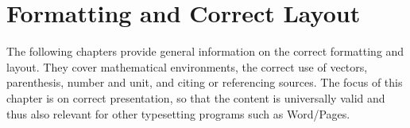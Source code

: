 
\chapter{Formatting and Correct Layout}
\label{cha:formatting}
The following chapters provide general information on the correct formatting and layout. They cover mathematical environments, the correct use of vectors, parenthesis, number and unit, and citing or referencing sources. The focus of this chapter is on correct presentation, so that the content is universally valid and thus also relevant for other typesetting programs such as Word/Pages. 


